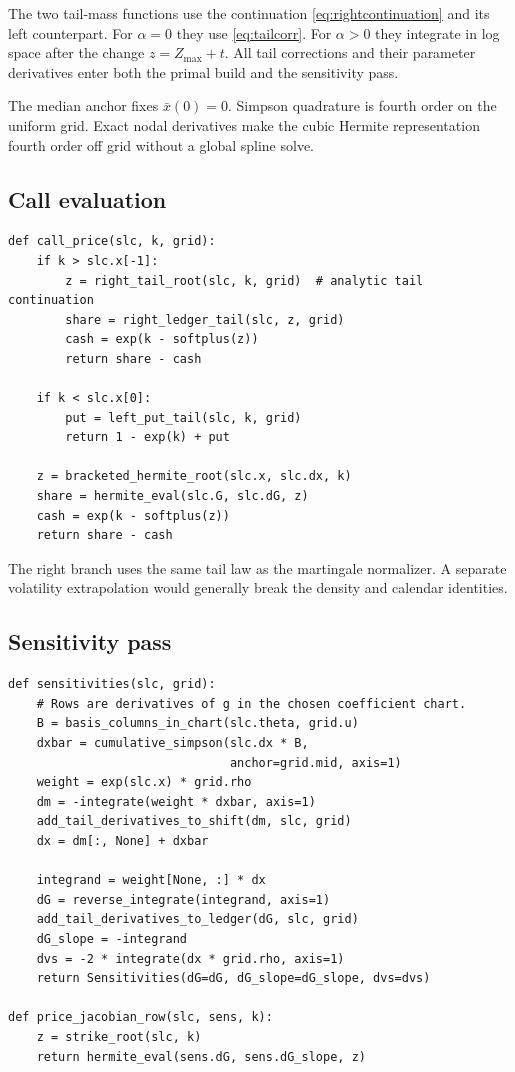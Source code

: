 The two tail-mass functions use the continuation
\eqref{eq:rightcontinuation} and its left counterpart.  For
$\alpha=0$ they use \eqref{eq:tailcorr}.  For $\alpha>0$ they integrate in
log space after the change $z=Z_{\max}+t$.  All tail corrections and their
parameter derivatives enter both the primal build and the sensitivity pass.

The median anchor fixes $\bar x(0)=0$.  Simpson quadrature is fourth order on
the uniform grid.  Exact nodal derivatives make the cubic Hermite
representation fourth order off grid without a global spline solve.

\subsection{Call evaluation}

\begin{lstlisting}[caption={Evaluate one normalized call.}]
def call_price(slc, k, grid):
    if k > slc.x[-1]:
        z = right_tail_root(slc, k, grid)  # analytic tail continuation
        share = right_ledger_tail(slc, z, grid)
        cash = exp(k - softplus(z))
        return share - cash

    if k < slc.x[0]:
        put = left_put_tail(slc, k, grid)
        return 1 - exp(k) + put

    z = bracketed_hermite_root(slc.x, slc.dx, k)
    share = hermite_eval(slc.G, slc.dG, z)
    cash = exp(k - softplus(z))
    return share - cash
\end{lstlisting}

The right branch uses the same tail law as the martingale normalizer.  A
separate volatility extrapolation would generally break the density and
calendar identities.

\subsection{Sensitivity pass}

\begin{lstlisting}[caption={All fixed-tail parameter sensitivities.}]
def sensitivities(slc, grid):
    # Rows are derivatives of g in the chosen coefficient chart.
    B = basis_columns_in_chart(slc.theta, grid.u)
    dxbar = cumulative_simpson(slc.dx * B,
                               anchor=grid.mid, axis=1)
    weight = exp(slc.x) * grid.rho
    dm = -integrate(weight * dxbar, axis=1)
    add_tail_derivatives_to_shift(dm, slc, grid)
    dx = dm[:, None] + dxbar

    integrand = weight[None, :] * dx
    dG = reverse_integrate(integrand, axis=1)
    add_tail_derivatives_to_ledger(dG, slc, grid)
    dG_slope = -integrand
    dvs = -2 * integrate(dx * grid.rho, axis=1)
    return Sensitivities(dG=dG, dG_slope=dG_slope, dvs=dvs)

def price_jacobian_row(slc, sens, k):
    z = strike_root(slc, k)
    return hermite_eval(sens.dG, sens.dG_slope, z)
\end{lstlisting}

